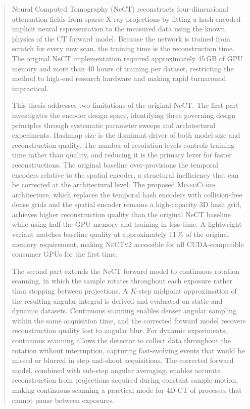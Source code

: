 \documentclass[12pt, a4paper, twoside]{report}
\newcommand{\NeCTv}{\textsc{NeCTv2}}
\newcommand{\MixedCubes}{\textsc{MixedCubes}}
\begin{document}



\begin{abstract}
Neural Computed Tomography (NeCT) reconstructs four-dimensional attenuation fields from sparse X-ray projections by fitting a hash-encoded implicit neural representation to the measured data using the known physics of the CT forward model. Because the network is trained from scratch for every new scan, the training time is the reconstruction time. The original NeCT implementation required approximately 45\,GB of GPU memory and more than 40 hours of training per dataset, restricting the method to high-end research hardware and making rapid turnaround impractical.

This thesis addresses two limitations of the original NeCT. The first part investigates the encoder design space, identifying three governing design principles through systematic parameter sweeps and architectural experiments. Hashmap size is the dominant driver of both model size and reconstruction quality. The number of resolution levels controls training time rather than quality, and reducing it is the primary lever for faster reconstructions. The original baseline over-provisions the temporal encoders relative to the spatial encoder, a structural inefficiency that can be corrected at the architectural level. The proposed \MixedCubes{} architecture, which replaces the temporal hash encoders with collision-free dense grids and the spatial encoder remains a high-capacity 3D hash grid, achieves higher reconstruction quality than the original NeCT baseline while using half the GPU memory and training in less time. A lightweight variant matches baseline quality at approximately 11\,\% of the original memory requirement, making \NeCTv{} accessible for all CUDA-compatible consumer GPUs for the first time.

The second part extends the NeCT forward model to continuous rotation scanning, in which the sample rotates throughout each exposure rather than stopping between projections. A $K$-step midpoint approximation of the resulting angular integral is derived and evaluated on static and dynamic datasets. Continuous scanning enables denser angular sampling within the same acquisition time, and the corrected forward model recovers reconstruction quality lost to angular blur. For dynamic experiments, continuous scanning allows the detector to collect data throughout the rotation without interruption, capturing fast-evolving events that would be missed or blurred in step-and-shoot acquisitions. The corrected forward model, combined with sub-step angular averaging, enables accurate reconstruction from projections acquired during constant sample motion, making continuous scanning a practical mode for 4D-CT of processes that cannot pause between exposures.
\end{abstract}
\end{document}

